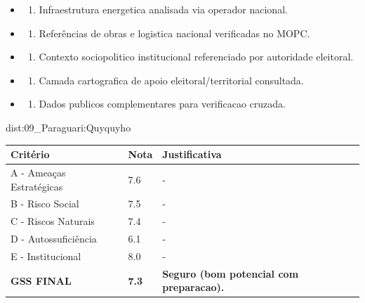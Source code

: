 {\begin{itemize}
\item
  \begin{enumerate}
  \def\labelenumi{\arabic{enumi})}
  \setcounter{enumi}{7}
  \tightlist
  \item
    Infraestrutura energetica analisada via operador nacional.
  \end{enumerate}
\item
  \begin{enumerate}
  \def\labelenumi{\arabic{enumi})}
  \setcounter{enumi}{8}
  \tightlist
  \item
    Referências de obras e logistica nacional verificadas no MOPC.
  \end{enumerate}
\item
  \begin{enumerate}
  \def\labelenumi{\arabic{enumi})}
  \setcounter{enumi}{9}
  \tightlist
  \item
    Contexto sociopolitico institucional referenciado por autoridade
    eleitoral.
  \end{enumerate}
\item
  \begin{enumerate}
  \def\labelenumi{\arabic{enumi})}
  \setcounter{enumi}{10}
  \tightlist
  \item
    Camada cartografica de apoio eleitoral/\allowbreak territorial consultada.
  \end{enumerate}
\item
  \begin{enumerate}
  \def\labelenumi{\arabic{enumi})}
  \setcounter{enumi}{11}
  \tightlist
  \item
    Dados publicos complementares para verificacao cruzada.
  \end{enumerate}
\end{itemize}}{dist:09_Paraguari:Quyquyho}
\begin{table}[ht!]
\small \begin{tabular}{p{3.0cm}p{0.8cm}p{6.0cm}} \toprule
\textbf{Critério} & \textbf{Nota} & \textbf{Justificativa} \\ \midrule
A - Ameaças Estratégicas & 7.6 & - \\
B - Risco Social & 7.5 & - \\
C - Riscos Naturais & 7.4 & - \\
D - Autossuficiência & 6.1 & - \\
E - Institucional & 8.0 & - \\
\midrule \textbf{GSS FINAL} & \textbf{7.3} & \textbf{Seguro (bom potencial com preparacao).} \\ \bottomrule \end{tabular}
\end{table}
